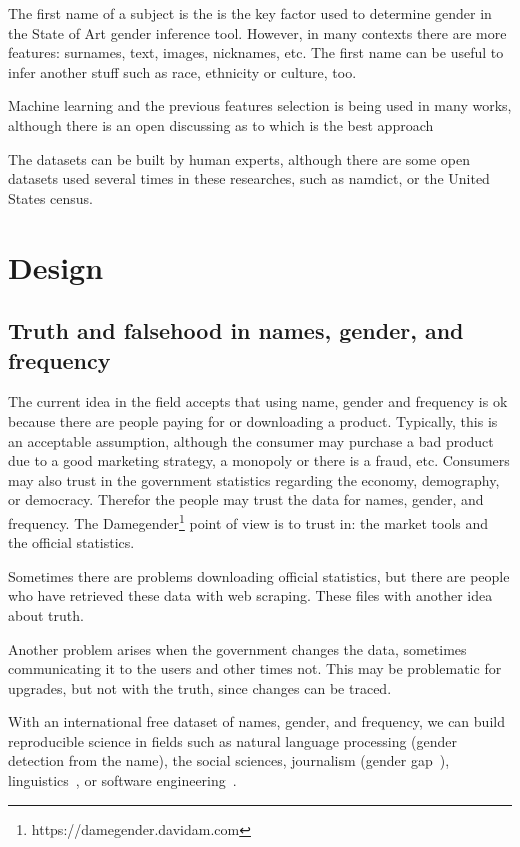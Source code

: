 \documentclass[a4paper]{article}
\begin{document}
The first name of a subject is the is the key factor used to
determine gender in the State of Art gender inference tool.
However, in many contexts there are more features: surnames,
text, images, nicknames, etc. The first name can be useful to
infer another stuff such as race, ethnicity or culture, too.

Machine learning and the previous features selection is being
used in many works, although there is an open discussing as
to which is the best approach

The datasets can be built by human experts, although there are
some open datasets used several times in these researches, such as
namdict, or the United States census.

\section{Design}
\label{sec:design}

\subsection{Truth and falsehood in names, gender, and frequency}
\label{sec:truthandfalsehood}

The current idea in the field accepts that using name, gender and
frequency is ok because there are people paying for or downloading
a product. Typically, this is an acceptable assumption, although
the consumer may purchase a bad product due to a good marketing
strategy, a monopoly or there is a fraud, etc. Consumers may also 
trust in the government statistics regarding the economy,
demography, or democracy. Therefor the people may trust the data
for names, gender, and frequency. The
Damegender\footnote{https://damegender.davidam.com} point of view
is to trust in: the market tools and the official statistics.

Sometimes there are problems downloading official statistics, but
there are people who have retrieved these data with web scraping.
These files with another idea about truth.

Another problem arises when the government changes the data,
sometimes communicating it to the users and other times
not. This may be problematic for upgrades, but not with the truth,
since changes can be traced. 

With an international free dataset of names, gender, and frequency,
we can build reproducible science in fields such as natural language
processing (gender detection from the name), the social sciences, 
journalism (gender
gap~\cite{holman2018gender,mislove2011understanding,niemi2017gendered,de2014genero}),
linguistics~\cite{lawson2005russian,krueger1962mongolian,van2020gender,agyekum2006sociolinguistic,fraser1987lexicon},
or software engineering~\cite{vasilescu2012gender}.
\end{document}
